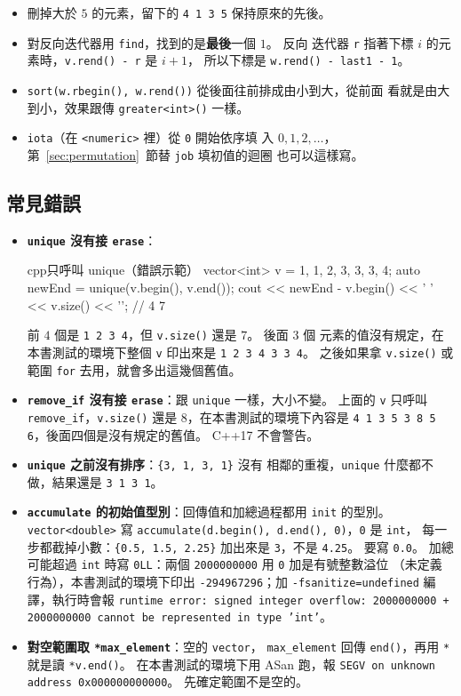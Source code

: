 \begin{itemize}
\item 刪掉大於 $5$ 的元素，留下的 \texttt{4 1 3 5} 保持原來的先後。
\item 對反向迭代器用 \texttt{find}，找到的是\textbf{最後}一個 $1$。 反向
迭代器 \texttt{r} 指著下標 $i$ 的元素時，\texttt{v.rend() - r} 是 $i + 1$，
所以下標是 \texttt{w.rend() - last1 - 1}。
\item \texttt{sort(w.rbegin(), w.rend())} 從後面往前排成由小到大，從前面
看就是由大到小，效果跟傳 \texttt{greater<int>()} 一樣。
\item \texttt{iota}（在 \texttt{<numeric>} 裡）從 \texttt{0} 開始依序填
入 $0, 1, 2, \dots$，第~\ref{sec:permutation}~節替 \texttt{job} 填初值的迴圈
也可以這樣寫。
\end{itemize}

\subsection{常見錯誤}

\begin{itemize}
\item \textbf{\texttt{unique} 沒有接 \texttt{erase}}：
\begin{code}{cpp}{只呼叫 unique（錯誤示範）}
vector<int> v = {1, 1, 2, 3, 3, 3, 4};
auto newEnd = unique(v.begin(), v.end());
cout << newEnd - v.begin() << ' ' << v.size() << '\n';   // 4 7
\end{code}
前 $4$ 個是 \texttt{1 2 3 4}，但 \texttt{v.size()} 還是 $7$。 後面 $3$ 個
元素的值沒有規定，在本書測試的環境下整個 \texttt{v} 印出來是
\texttt{1 2 3 4 3 3 4}。 之後如果拿 \texttt{v.size()} 或範圍 \texttt{for}
去用，就會多出這幾個舊值。
\item \textbf{\texttt{remove\_if} 沒有接 \texttt{erase}}：跟
\texttt{unique} 一樣，大小不變。 上面的 \texttt{v} 只呼叫
\texttt{remove\_if}，\texttt{v.size()} 還是 $8$，在本書測試的環境下內容是
\texttt{4 1 3 5 3 8 5 6}，後面四個是沒有規定的舊值。 C++17 不會警告。
\item \textbf{\texttt{unique} 之前沒有排序}：\texttt{\{3, 1, 3, 1\}} 沒有
相鄰的重複，\texttt{unique} 什麼都不做，結果還是 \texttt{3 1 3 1}。
\item \textbf{\texttt{accumulate} 的初始值型別}：回傳值和加總過程都用
\texttt{init} 的型別。 \texttt{vector<double>} 寫
\texttt{accumulate(d.begin(), d.end(), 0)}，\texttt{0} 是 \texttt{int}，
每一步都截掉小數：\texttt{\{0.5, 1.5, 2.25\}} 加出來是 \texttt{3}，不是
\texttt{4.25}。 要寫 \texttt{0.0}。 加總可能超過 \texttt{int} 時寫
\texttt{0LL}：兩個 \texttt{2000000000} 用 \texttt{0} 加是有號整數溢位
（未定義行為），本書測試的環境下印出 \texttt{-294967296}；加
\texttt{-fsanitize=undefined} 編譯，執行時會報 \texttt{runtime error: signed
integer overflow: 2000000000 + 2000000000 cannot be represented in type
'int'}。
\item \textbf{對空範圍取 \texttt{*max\_element}}：空的 \texttt{vector}，
\texttt{max\_element} 回傳 \texttt{end()}，再用 \texttt{*} 就是讀
\texttt{*v.end()}。 在本書測試的環境下用 ASan 跑，報
\texttt{SEGV on unknown address 0x000000000000}。 先確定範圍不是空的。
\end{itemize}

